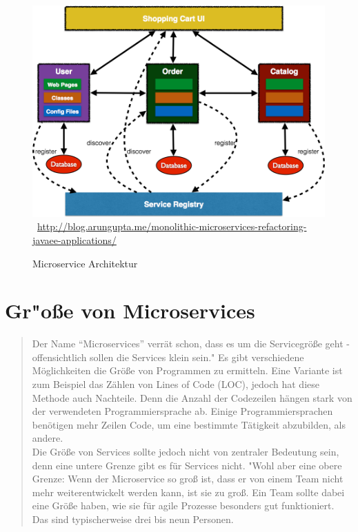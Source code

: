 \begin{figure}[htb]
	\centering 
	\includegraphics[width=\linewidth]{content/images/javaee-microservices}\
	\quelle\url{http://blog.arungupta.me/monolithic-microservices-refactoring-javaee-applications/}
	\caption{Microservice Architektur\\}
	\label{fig:MicroserviceArchitektur} 
\end{figure}

\section{Gr"o\ss e von Microservices}
\label{sec:groesseMicroservice}
\begin{quotation}
    \frqq Der Name "`Microservices"' verrät schon, dass es um die Servicegröße geht - offensichtlich sollen die Services klein sein."\cite[S. 31]{EWolff2016:Microservices} Es gibt verschiedene Möglichkeiten die Größe von Programmen zu ermitteln. Eine Variante ist zum Beispiel das Zählen von  Lines of Code (LOC), jedoch hat diese Methode auch Nachteile. Denn die Anzahl der Codezeilen hängen stark von der verwendeten Programmiersprache ab. Einige Programmiersprachen benötigen mehr Zeilen Code, um eine bestimmte Tätigkeit abzubilden, als andere.
    \\
    Die Größe von Services sollte jedoch nicht von zentraler Bedeutung sein, denn eine untere Grenze gibt es für Services nicht. "Wohl aber eine obere Grenze: Wenn der Microservice so groß ist, dass er von einem Team nicht mehr weiterentwickelt werden kann, ist sie zu groß. Ein Team sollte dabei eine Größe haben, wie sie für agile Prozesse besonders gut funktioniert. Das sind typischerweise drei bis neun Personen.\flqq\cite[S. 34]{EWolff2016:Microservices}
\end{quotation}

